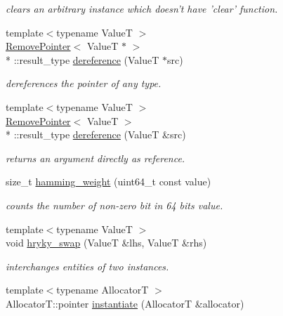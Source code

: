 \begin{DoxyCompactItemize}
\begin{DoxyCompactList}\small\item\em clears an arbitrary instance which doesn't have 'clear' function. \end{DoxyCompactList}\item 
{\footnotesize template$<$typename Value\-T $>$ }\\\hyperlink{classhryky_1_1_remove_pointer}{Remove\-Pointer}$<$ Value\-T $\ast$ $>$\\*
\-::result\-\_\-type \hyperlink{group__generic__programming_ga74adf3223a4335c89d64f985d0bcc29e}{dereference} (Value\-T $\ast$src)
\begin{DoxyCompactList}\small\item\em dereferences the pointer of any type. \end{DoxyCompactList}\item 
\hypertarget{group__generic__programming_ga4ea1ee0ac8835fd32da649ee7dea3355}{{\footnotesize template$<$typename Value\-T $>$ }\\\hyperlink{classhryky_1_1_remove_pointer}{Remove\-Pointer}$<$ Value\-T $>$\\*
\-::result\-\_\-type \hyperlink{group__generic__programming_ga4ea1ee0ac8835fd32da649ee7dea3355}{dereference} (Value\-T \&src)}\label{group__generic__programming_ga4ea1ee0ac8835fd32da649ee7dea3355}

\begin{DoxyCompactList}\small\item\em returns an argument directly as reference. \end{DoxyCompactList}\item 
size\-\_\-t \hyperlink{namespacehryky_a265f8a87bd7b6cb78967dd5e49c49444}{hamming\-\_\-weight} (uint64\-\_\-t const value)
\begin{DoxyCompactList}\small\item\em counts the number of non-\/zero bit in 64 bits value. \end{DoxyCompactList}\item 
\hypertarget{namespacehryky_add9c1c1fdfda07cd47bcb7c16d3a823a}{{\footnotesize template$<$typename Value\-T $>$ }\\void \hyperlink{namespacehryky_add9c1c1fdfda07cd47bcb7c16d3a823a}{hryky\-\_\-swap} (Value\-T \&lhs, Value\-T \&rhs)}\label{namespacehryky_add9c1c1fdfda07cd47bcb7c16d3a823a}

\begin{DoxyCompactList}\small\item\em interchanges entities of two instances. \end{DoxyCompactList}\item 
\hypertarget{namespacehryky_a7e731db6d90571cf1aea6e113d43b6ad}{{\footnotesize template$<$typename Allocator\-T $>$ }\\Allocator\-T\-::pointer \hyperlink{namespacehryky_a7e731db6d90571cf1aea6e113d43b6ad}{instantiate} (Allocator\-T \&allocator)}\label{namespacehryky_a7e731db6d90571cf1aea6e113d43b6ad}


\end{DoxyCompactItemize}
